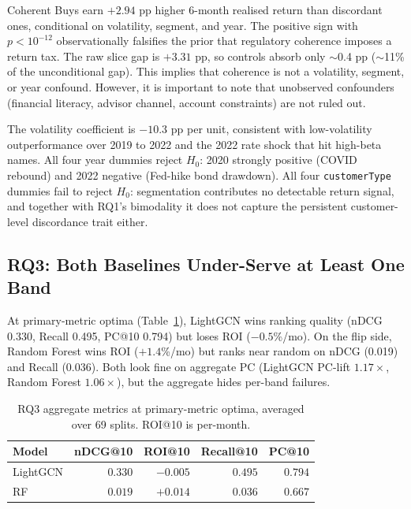 Coherent Buys earn $+2.94$ pp higher 6-month realised return than discordant ones, conditional on volatility, segment, and year. The positive sign with $p < 10^{-12}$ observationally falsifies the prior that regulatory coherence imposes a return tax. The raw slice gap is $+3.31$ pp, so controls absorb only $\sim$0.4 pp ($\sim$11\% of the unconditional gap). This implies that coherence is not a volatility, segment, or year confound. However, it is important to note that unobserved confounders (financial literacy, advisor channel, account constraints) are not ruled out.

The volatility coefficient is $-10.3$ pp per unit, consistent with low-volatility outperformance over 2019 to 2022 and the 2022 rate shock that hit high-beta names. All four year dummies reject $H_0$: 2020 strongly positive (COVID rebound) and 2022 negative (Fed-hike bond drawdown). All four \texttt{customerType} dummies fail to reject $H_0$: segmentation contributes no detectable return signal, and together with RQ1's bimodality it does not capture the persistent customer-level discordance trait either.

\subsection{RQ3: Both Baselines Under-Serve at Least One Band}
\label{sec:results:rq3}

At primary-metric optima (Table~\ref{tab:rq3-aggregate}), LightGCN wins ranking quality (nDCG 0.330, Recall 0.495, PC@10 0.794) but loses ROI ($-0.5$\%/mo). On the flip side, Random Forest wins ROI ($+1.4$\%/mo) but ranks near random on nDCG (0.019) and Recall (0.036). Both look fine on aggregate PC (LightGCN PC-lift $1.17\times$, Random Forest $1.06\times$), but the aggregate hides per-band failures.

\begin{table}[H]
\centering
\small
\begin{tabular}{lrrrr}
\toprule
Model & nDCG@10 & ROI@10 & Recall@10 & PC@10 \\
\midrule
LightGCN      & $0.330$ & $-0.005$ & $0.495$ & $0.794$ \\
RF            & $0.019$ & $+0.014$ & $0.036$ & $0.667$ \\
\bottomrule
\end{tabular}
\caption{RQ3 aggregate metrics at primary-metric optima, averaged over 69 splits. ROI@10 is per-month.}
\label{tab:rq3-aggregate}
\end{table}

